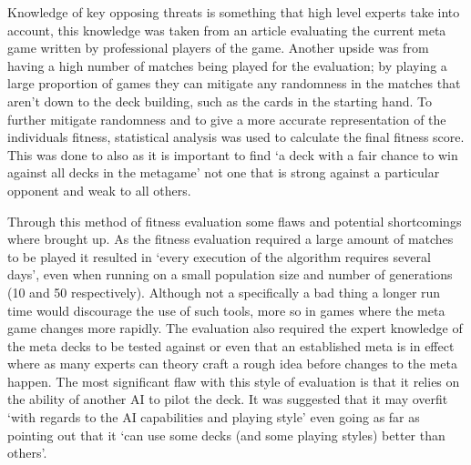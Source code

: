 \documentclass[a4paper]{article}
\begin{document}
Knowledge of key opposing threats is something that high level experts take into account, this knowledge was taken from an article evaluating the current meta game written by professional players of the game.
Another upside was from having a high number of matches being played for the evaluation; by playing a large proportion of games they can mitigate any randomness in the matches that aren't down to the deck building, such as the cards in the starting hand.
To further mitigate randomness and to give a more accurate representation of the individuals fitness, statistical analysis was used to calculate the final fitness score.
This was done to also as it is important to find `a deck with a fair chance to win against all decks in the metagame' not one that is strong against a particular opponent and weak to all others.
\par
Through this method of fitness evaluation some flaws and potential shortcomings where brought up.
As the fitness evaluation required a large amount of matches to be played it resulted in `every execution of the algorithm requires several days'\cite{hearthstoneAI}, even when running on a small population size and number of generations (10 and 50 respectively).
Although not a specifically a bad thing a longer run time would discourage the use of such tools, more so in games where the meta game changes more rapidly.
The evaluation also required the expert knowledge of the meta decks to be tested against or even that an established meta is in effect where as many experts can theory craft a rough idea before changes to the meta happen.
The most significant flaw with this style of evaluation is that it relies on the ability of another AI to pilot the deck.
It was suggested that it may overfit `with regards to the AI capabilities and playing style' even going as far as pointing out that it `can use some decks (and some playing styles) better than others'\cite{hearthstoneAI}.
\end{document}
